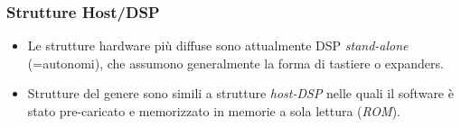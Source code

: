 \begin{frame}
    \frametitle{Strutture Host/DSP}

	\begin{itemize}[<+- | alert@+->]

		\item Le strutture hardware pi\`u diffuse sono
              attualmente DSP \emph{stand-alone}
              (=autonomi), che assumono generalmente
              la forma di tastiere o expanders.

		\item Strutture del genere sono simili a strutture
              \emph{host-DSP} nelle quali
              il software \`e stato pre-caricato
              e memorizzato in memorie a sola lettura (\emph{ROM}).

	\end{itemize}


\end{frame}

